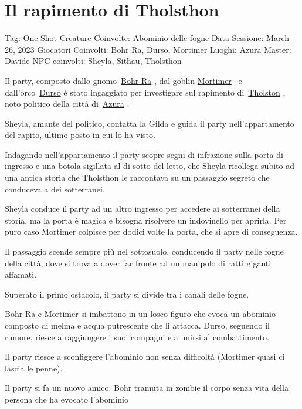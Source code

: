 \section{Il rapimento di Tholsthon}\label{il-rapimento-di-tholsthon}

Tag: One-Shot Creature Coinvolte: Abominio delle fogne Data Sessione:
March 26, 2023 Giocatori Coinvolti: Bohr Ra, Durso, Mortimer Luoghi:
Azura Master: Davide NPC coinvolti: Sheyla, Sithau, Tholsthon

Il party, composto dallo
gnomo~\href{Bohr\%20Ra\%2064449ef6c46549e9abf62b9d7e01a69d.md}{Bohr Ra}
, dal goblin
\href{Mortimer\%20dd05de2dfc924adb9c9173c975e03e90.md}{Mortimer} ~e
dall'orco~\href{Durso\%201300f1f2704341b8af557e877374018c.md}{Durso} è
stato ingaggiato per investigare sul rapimento
di~\href{Tholston\%20a6eb9c30e55940fda990e1fd85165304.md}{Tholston} ,
noto politico della città
di~\href{Azura\%207c14164a934a40648d94bf415b52eee0.md}{Azura} .

Sheyla, amante del politico, contatta la Gilda e guida il party
nell'appartamento del rapito, ultimo posto in cui lo ha visto.

Indagando nell'appartamento il party scopre segni di infrazione sulla
porta di ingresso e una botola sigillata al di sotto del letto, che
Sheyla ricollega subito ad una antica storia che Tholsthon le raccontava
su un passaggio segreto che conduceva a dei sotterranei.

Sheyla conduce il party ad un altro ingresso per accedere ai sotterranei
della storia, ma la porta è magica e bisogna risolvere un indovinello
per aprirla. Per puro caso Mortimer colpisce per dodici volte la porta,
che si apre di conseguenza.

Il passaggio scende sempre più nel sottosuolo, conducendo il party nelle
fogne della città, dove si trova a dover far fronte ad un manipolo di
ratti giganti affamati.

Superato il primo ostacolo, il party si divide tra i canali delle fogne.

Bohr Ra e Mortimer si imbattono in un losco figuro che evoca un abominio
composto di melma e acqua putrescente che li attacca. Durso, seguendo il
rumore, riesce a raggiungere i suoi compagni e a unirsi al
combattimento.

Il party riesce a sconfiggere l'abominio non senza difficoltà (Mortimer
quasi ci lascia le penne).

Il party si fa un nuovo amico: Bohr tramuta in zombie il corpo senza
vita della persona che ha evocato l'abominio

